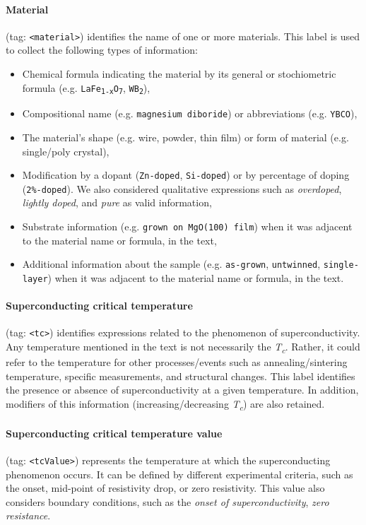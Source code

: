 \paragraph{Material} (tag: \texttt{<material>}) identifies the name of one or more materials. 
This label is used to collect the following types of information: 
\begin{itemize}
    \item Chemical formula indicating the material by its general or stochiometric formula (e.g. \texttt{LaFe\textsubscript{1-x}O\textsubscript{7}}, \texttt{WB\textsubscript{2}}),
    \item Compositional name (e.g. \texttt{magnesium diboride}) or abbreviations (e.g. \texttt{YBCO}), 
    \item The material's shape (e.g. wire, powder, thin film) or form of material (e.g. single/poly crystal), 
    \item Modification by a dopant (\texttt{Zn-doped}, \texttt{Si-doped}) or by percentage of doping (\texttt{2\%-doped}). We also considered qualitative expressions such as \textit{overdoped}, \textit{lightly doped}, and \textit{pure} as valid information, 
    \item Substrate information (e.g. \texttt{grown on MgO(100) film}) when it was adjacent to the material name or formula, in the text,
    \item Additional information about the sample (e.g. \texttt{as-grown}, \texttt{untwinned}, \texttt{single-layer}) when it was adjacent to the material name or formula, in the text. 
\end{itemize}

\paragraph{Superconducting critical temperature} (tag: \texttt{<tc>}) identifies expressions related to the phenomenon of superconductivity. Any temperature mentioned in the text is not necessarily the \textit{T\textsubscript{c}}. Rather, it could refer to the temperature for other processes/events such as annealing/sintering temperature, specific measurements, and structural changes.
This label identifies the presence or absence of superconductivity at a given temperature.
In addition, modifiers of this information (increasing/decreasing \textit{T\textsubscript{c}}) are also retained. 

\paragraph{Superconducting critical temperature value} (tag: \texttt{<tcValue>}) represents the temperature at which the superconducting phenomenon occurs. 
It can be defined by different experimental criteria, such as the onset, mid-point of resistivity drop, or zero resistivity.
This value also considers boundary conditions, such as the \textit{onset of superconductivity}, \textit{zero resistance}. 

